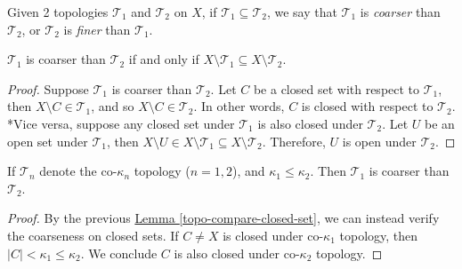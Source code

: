 \documentclass{treatise}
\begin{document}
Given 2 topologies $\mathcal{T}_1$ and $\mathcal{T}_2$ on $X$, if $\mathcal{T}_1 \subseteq \mathcal{T}_2$, we say that $\mathcal{T}_1$ is \emph{coarser} than $\mathcal{T}_2$, or $\mathcal{T}_2$ is \emph{finer} than $\mathcal{T}_1$.
\begin{lemma} \label{topo-compare-closed-set}
$\mathcal{T}_1$ is coarser than $\mathcal{T}_2$ if and only if $X \setminus \mathcal{T}_1 \subseteq X \setminus \mathcal{T}_2$.
\end{lemma}
\begin{proof}
Suppose $\mathcal{T}_1$ is coarser than $\mathcal{T}_2$. Let $C$ be a closed set with respect to $\mathcal{T}_1$, then $X \setminus C \in \mathcal{T}_1$, and so $X \setminus C \in \mathcal{T}_2$. In other words, $C$ is closed with respect to $\mathcal{T}_2$.
\\
*Vice versa, suppose any closed set under $\mathcal{T}_1$ is also closed under $\mathcal{T}_2$. Let $U$ be an open set under $\mathcal{T}_1$, then $X \setminus U \in X \setminus \mathcal{T}_1 \subseteq X \setminus \mathcal{T}_2$. Therefore, $U$ is open under $\mathcal{T}_2$.
\end{proof}
\begin{proposition} \label{co-kappa-compare}
If $\mathcal{T}_n$ denote the co-$\kappa_n$ topology ($n = 1, 2$), and $\kappa_1 \leq \kappa_2$. Then $\mathcal{T}_1$ is coarser than $\mathcal{T}_2$.
\end{proposition}
\begin{proof}
By the previous \hyperref[topo-compare-closed-set]{Lemma \ref*{topo-compare-closed-set}}, we can instead verify the coarseness on closed sets. If $C \neq X$ is closed under co-$\kappa_1$ topology, then $|C| < \kappa_1 \leq \kappa_2$. We conclude $C$ is also closed under co-$\kappa_2$ topology.
\end{proof}

\newpage
\end{document}
